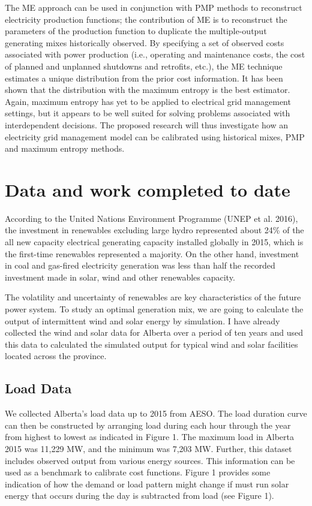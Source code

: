 \documentclass[10pt,letter]{article}
\begin{document}
The ME approach can be used in conjunction with PMP methods to
reconstruct electricity production functions; the contribution of ME is
to reconstruct the parameters of the production function to duplicate
the multiple-output generating mixes historically observed. By
specifying a set of observed costs associated with power production
(i.e., operating and maintenance costs, the cost of planned and
unplanned shutdowns and retrofits, etc.), the ME technique estimates a
unique distribution from the prior cost information. It has been shown
that the distribution with the maximum entropy is the best estimator.
Again, maximum entropy has yet to be applied to electrical grid
management settings, but it appears to be well suited for solving
problems associated with interdependent decisions. The proposed research
will thus investigate how an electricity grid management model can be
calibrated using historical mixes, PMP and maximum entropy methods.

\section{Data and work completed to
date}\label{data-and-work-completed-to-date}

According to the United Nations Environment Programme (UNEP et al.
2016), the investment in renewables excluding large hydro represented
about 24\% of the all new capacity electrical generating capacity
installed globally in 2015, which is the first-time renewables
represented a majority. On the other hand, investment in coal and
gas-fired electricity generation was less than half the recorded
investment made in solar, wind and other renewables capacity.

The volatility and uncertainty of renewables are key characteristics of
the future power system. To study an optimal generation mix, we are
going to calculate the output of intermittent wind and solar energy by
simulation. I have already collected the wind and solar data for Alberta
over a period of ten years and used this data to calculated the
simulated output for typical wind and solar facilities located across
the province.

\subsection{Load Data}\label{load-data}

We collected Alberta's load data up to 2015 from AESO. The load duration
curve can then be constructed by arranging load during each hour through
the year from highest to lowest as indicated in Figure 1. The maximum
load in Alberta 2015 was 11,229 MW, and the minimum was 7,203 MW.
Further, this dataset includes observed output from various energy
sources. This information can be used as a benchmark to calibrate cost
functions. Figure 1 provides some indication of how the demand or load
pattern might change if must run solar energy that occurs during the day
is subtracted from load (see Figure 1).
\end{document}
